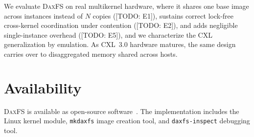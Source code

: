 \documentclass[letterpaper,twocolumn,10pt]{article}
\newcommand{\daxfs}{\textsc{DaxFS}\xspace}
\newcommand{\todo}[1]{[TODO: #1]}
\begin{document}
We evaluate \daxfs on real multikernel hardware, where it shares one
base image across instances instead of $N$ copies (\todo{E1}), sustains
correct lock-free cross-kernel coordination under contention
(\todo{E2}), and adds negligible single-instance overhead (\todo{E5}),
and we characterize the CXL generalization by emulation.  As CXL~3.0
hardware matures, the same design carries over to disaggregated memory
shared across hosts.

\section*{Availability}

\daxfs is available as open-source software~\cite{daxfs:repo}.  The
implementation includes the Linux kernel module, \texttt{mkdaxfs}
image creation tool, and \texttt{daxfs-inspect} debugging tool.
\end{document}
